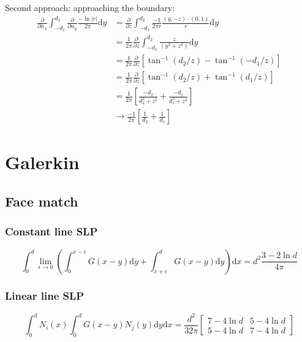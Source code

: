 \documentclass[a4paper,11pt]{article}
\newcommand{\td}{\mathrm{d}}
\begin{document}
Second approach: approaching the boundary:
%
\begin{align}
\frac{\partial}{\partial n_x}
\int_{-d_1}^{d_2} 
\frac{\partial}{\partial n_y}
\frac{-\ln |r|}{2\pi}
\td y 
&=
\frac{\partial}{\partial z}
\int_{-d_1}^{d_2} 
\frac{-1}{2\pi r} \frac{(y, -z) \cdot (0,1)}{r}
\td y \nonumber \\
&=
\frac{1}{2\pi} \frac{\partial}{\partial z}
\int_{-d_1}^{d_2} 
\frac{z}{\left(y^2+z^2\right)}
\td y \nonumber \\
&=
\frac{1}{2\pi} \frac{\partial}{\partial z}
\left[
\tan^{-1}\left(d_2/z\right)
-
\tan^{-1}\left(-d_1/z\right)
\right]
\nonumber \\
&=
\frac{1}{2\pi} \frac{\partial}{\partial z}
\left[
\tan^{-1}\left(d_2/z\right) + \tan^{-1}\left(d_1/z\right)
\right]
\nonumber \\
&=
\frac{1}{2\pi} 
\left[
\frac{-d_2}{d_2^2+z^2} + \frac{-d_1}{d_1^2+z^2}
\right]
\nonumber \\
& \to
\frac{-1}{2\pi} 
\left[
\frac{1}{d_2} + \frac{1}{d_1}
\right]
\end{align}


\section{Galerkin}

\subsection{Face match}

\subsubsection{Constant line SLP}

\begin{equation}
\int_{0}^{d}
\lim_{\epsilon \to 0}
\left(
\int_{0}^{x-\epsilon} G(x-y) \td y
+
\int_{x+\epsilon}^{d} G(x-y) \td y
\right)
\td x
=
d^2\frac{3-2\ln d}{4\pi}
\end{equation}

\subsubsection{Linear line SLP}

\begin{equation}
\int_{0}^{d} N_i(x) \int_{0}^{d} G(x-y) N_j(y) \td y \td x
=
\frac{d^2}{32\pi} \begin{bmatrix}
7-4 \ln d & 5 - 4 \ln d \\
5-4 \ln d & 7 - 4 \ln d
\end{bmatrix}
\end{equation}
\end{document}
